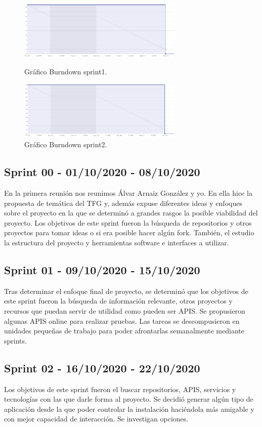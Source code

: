 \begin{figure}
    \centering
    \includegraphics[width=0.7\textwidth]{img/BurnDown/1.PNG}
    \caption{Gráfico Burndown sprint1. } \label{BD1}
    \includegraphics[width=0.7\textwidth]{img/BurnDown/2.PNG}
    \caption{Gráfico Burndown sprint2. } \label{BD2}
\end{figure}

\subsection{Sprint 00 - 01/10/2020 - 08/10/2020}
En la primera reunión nos reunimos Álvar Arnaiz González y yo. En ella hice la propuesta de temática del TFG y, además expuse diferentes ideas y enfoques sobre el proyecto en la que se determinó a grandes rasgos la posible viabilidad del proyecto.
Los objetivos de este sprint fueron la búsqueda de repositorios y otros proyectos para tomar ideas o si era posible hacer algún fork. También, el estudio la estructura del proyecto y herramientas software e interfaces a utilizar.

\subsection{Sprint 01 - 09/10/2020 - 15/10/2020}
Tras determinar el enfoque final de proyecto, se determinó que los objetivos de este sprint fueron la búsqueda de información relevante, otros proyectos y recursos que puedan servir de utilidad como pueden ser APIS. Se propusieron algunas APIS online para realizar pruebas.
Las tareas se descompusieron en unidades pequeñas de trabajo para poder afrontarlas semanalmente mediante sprints.



\subsection{Sprint 02 - 16/10/2020 - 22/10/2020}
Los objetivos de este sprint fueron el buscar repositorios, APIS, servicios y tecnologías con las que darle forma al proyecto. Se decidió generar algún tipo de aplicación desde la que poder controlar la instalación haciéndola más amigable y con mejor capacidad de interacción. Se investigan opciones.



